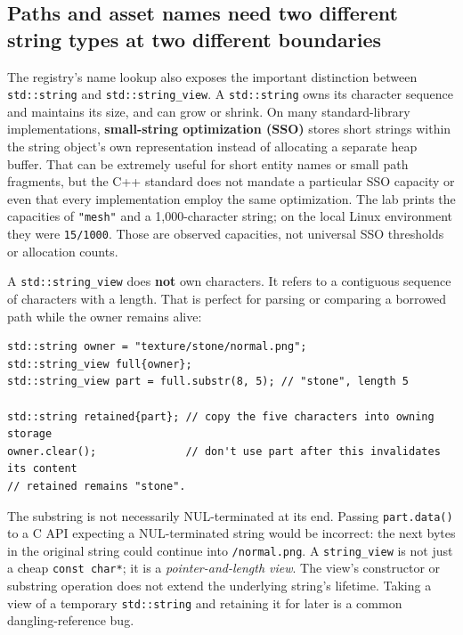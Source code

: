 \subsection{Paths and asset names need two different string types at two different boundaries}\label{01-foundations-i-ch006-paths-and-asset-names-need-two-different-string-types-at-two-different-boundaries}

The registry's name lookup also exposes the important distinction between \texttt{std::string} and \texttt{std::string\_view}. A \texttt{std::string} owns its character sequence and maintains its size, and can grow or shrink. On many standard-library implementations, \textbf{small-string optimization (SSO)} stores short strings within the string object's own representation instead of allocating a separate heap buffer. That can be extremely useful for short entity names or small path fragments, but the C++ standard does not mandate a particular SSO capacity or even that every implementation employ the same optimization. The lab prints the capacities of \texttt{"mesh"} and a 1,000-character string; on the local Linux environment they were \texttt{15/1000}. Those are observed capacities, not universal SSO thresholds or allocation counts.

A \texttt{std::string\_view} does \textbf{not} own characters. It refers to a contiguous sequence of characters with a length. That is perfect for parsing or comparing a borrowed path while the owner remains alive:

\begin{verbatim}
std::string owner = "texture/stone/normal.png";
std::string_view full{owner};
std::string_view part = full.substr(8, 5); // "stone", length 5

std::string retained{part}; // copy the five characters into owning storage
owner.clear();              // don't use part after this invalidates its content
// retained remains "stone".
\end{verbatim}

The substring is not necessarily NUL-terminated at its end. Passing \texttt{part.data()} to a C API expecting a NUL-terminated string would be incorrect: the next bytes in the original string could continue into \texttt{/normal.png}. A \texttt{string\_view} is not just a cheap \texttt{const\ char*}; it is a \emph{pointer-and-length view}. The view's constructor or substring operation does not extend the underlying string's lifetime. Taking a view of a temporary \texttt{std::string} and retaining it for later is a common dangling-reference bug.

